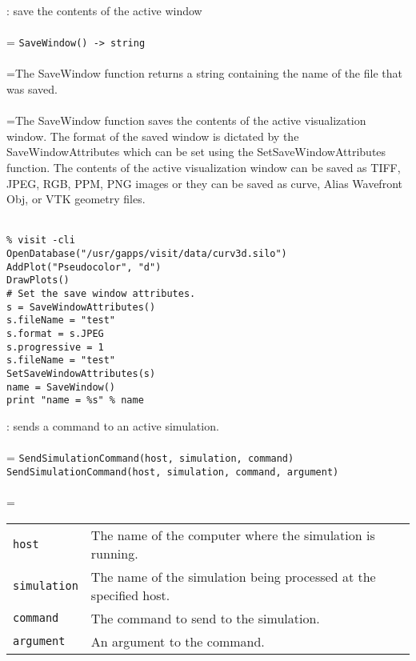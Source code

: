 \documentclass[10pt,a4paper]{report}
\begin{document}
{}
: save the contents of the active window\\[-3mm]

 \\ 
\hangindent=\parindent 
\verb!SaveWindow() -> string!\\ [-3mm]

 \\ 
\hangindent=\parindent The SaveWindow function returns a string containing the name of the file that was saved. \\[-3mm] 

 \\ 
\hangindent=\parindent The SaveWindow function saves the contents of the active visualization window. The format of the saved window is dictated by the SaveWindowAttributes which can be set using the SetSaveWindowAttributes function. The contents of the active visualization window can be saved as TIFF, JPEG, RGB, PPM, PNG images or they can be saved as curve, Alias Wavefront Obj, or VTK geometry files. \\[-3mm] 

\\[-6mm]
\begin{verbatim}% visit -cli
OpenDatabase("/usr/gapps/visit/data/curv3d.silo")
AddPlot("Pseudocolor", "d")
DrawPlots()
# Set the save window attributes.
s = SaveWindowAttributes()
s.fileName = "test"
s.format = s.JPEG
s.progressive = 1
s.fileName = "test"
SetSaveWindowAttributes(s)
name = SaveWindow()
print "name = %s" % name
\end{verbatim}
\newpage


{}
: sends a command to an active simulation.\\[-3mm]

 \\ 
\hangindent=\parindent 
\verb!SendSimulationCommand(host, simulation, command)!\\ 
\verb!SendSimulationCommand(host, simulation, command, argument)!\\ [-3mm]

 \\ 
\hangindent=\parindent 
\begin{tabular}{lp{9cm}}
\verb!host! & The name of the computer where the simulation is running. \\
\verb!simulation! & The name of the simulation being processed at the specified host. \\
\verb!command! & The command to send to the simulation. \\
\verb!argument! & An argument to the command. \\
\end{tabular} \\[-2mm]
\end{document}
